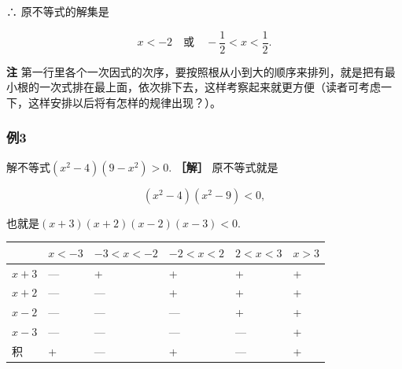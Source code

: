 ∴ 原不等式的解集是

\[
x < - 2 \quad \text{或} \quad - \frac{1}{2} < x < \frac{1}{2}.
\]

\textbf{注}
第一行里各个一次因式的次序，要按照根从小到大的顺序来排列，就是把有最小根的一次式排在最上面，依次排下去，这样考察起来就更方便（读者可考虑一下，这样安排以后将有怎样的规律出现？）。

\subsubsection{例3}

解不等式\((x^{2}-4)(9-x^{2})>0.\) \textbf{［解］} 原不等式就是

\[
(x^{2} - 4) (x^{2} - 9) < 0,
\]

也就是\((x + 3)(x + 2)(x - 2)(x - 3) < 0.\)

{\def\LTcaptype{none} %
\begin{longtable}[]{@{}
  >{\raggedright\arraybackslash}p{}
  >{\raggedright\arraybackslash}p{}
  >{\raggedright\arraybackslash}p{}
  >{\raggedright\arraybackslash}p{}
  >{\raggedright\arraybackslash}p{}
  >{\raggedright\arraybackslash}p{}@{}}
\toprule\noalign{}
\begin{minipage}[b]{\linewidth}\raggedright
\end{minipage} & \begin{minipage}[b]{\linewidth}\raggedright
\(x < -3\)
\end{minipage} & \begin{minipage}[b]{\linewidth}\raggedright
\(-3 < x < -2\)
\end{minipage} & \begin{minipage}[b]{\linewidth}\raggedright
\(-2 < x < 2\)
\end{minipage} & \begin{minipage}[b]{\linewidth}\raggedright
\(2 < x < 3\)
\end{minipage} & \begin{minipage}[b]{\linewidth}\raggedright
\(x > 3\)
\end{minipage} \\
\midrule\noalign{}
\endhead
\bottomrule\noalign{}
\endlastfoot
\(x+3\) & --- & + & + & + & + \\
\(x+2\) & --- & --- & + & + & + \\
\(x-2\) & --- & --- & --- & + & + \\
\(x-3\) & --- & --- & --- & --- & + \\
积 & + & --- & + & --- & + \\
\end{longtable}
}

